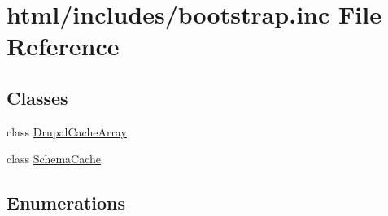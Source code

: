 \hypertarget{bootstrap_8inc}{
\section{html/includes/bootstrap.inc File Reference}
\label{bootstrap_8inc}
}
\subsection*{Classes}
\begin{DoxyCompactItemize}
\item 
class \hyperlink{classDrupalCacheArray}{DrupalCacheArray}
\item 
class \hyperlink{classSchemaCache}{SchemaCache}
\end{DoxyCompactItemize}
\subsection*{Enumerations}
